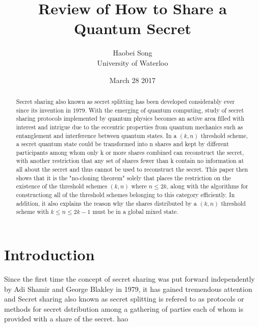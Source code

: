 \documentclass[12pt]{article}
\title{\textbf{Review of How to Share a Quantum Secret}}
\author{Haobei Song\\University of Waterloo}
\date{March 28 2017}
\begin{document}
\maketitle
\newpage


\begin{abstract}
	Secret sharing also known as secret splitting has been developed considerably ever since its invention in 1979. With the emerging of quantum computing, study of secret sharing protocols implemented by quantum physics becomes an active area filled with interest and intrigue due to the eccentric properties from quantum mechanics such as entanglement and interference between quantum states.
	In a $(k,n)$ threshold scheme, a secret quantum state could be transformed into n shares and kept by different participants among whom only k or more shares combined can reconstruct the secret, with another restriction that any set of shares fewer than k contain no information at all about the secret and thus cannot be used to reconstruct the secret.
	This paper then shows that it is the "no-cloning theorem" solely that places the restriction on the existence of the threshold schemes $(k, n)$ where $n \le 2k$, along with the algorithms for constructiong all of the threshold schemes belonging to this category efficiently. In addition, it also explains the reason why the shares distributed by a $(k,n)$ threshold scheme with $k \leq n \le 2k-1$ must be in a global mixed state.
	

\end{abstract}
\section{Introduction}
Since the first time the concept of secret sharing was put forward independently by Adi Shamir and George Blakley in 1979, it has gained tremendous attention and 
	Secret sharing also known as secret splitting is refered to as protocols or methods for secret dstribution among a gathering of parties each of whom is provided with a share of the secret. hao
\end{document}
